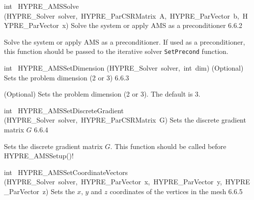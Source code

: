 \documentclass{article}
\begin{document}
\begin{cxxentry}
\begin{cxxentry}
\begin{cxxfunction}
\begin{cxxdoc}
\end{cxxdoc}
\end{cxxfunction}
\begin{cxxfunction}
{int\ }
        {HYPRE\_AMSSolve}
        {(HYPRE\_Solver\ solver,\ HYPRE\_ParCSRMatrix\ A,\ HYPRE\_ParVector\ b,\ HYPRE\_ParVector\ x)}
        {
Solve the system or apply AMS as a preconditioner}
        {6.6.2}
\begin{cxxdoc}

Solve the system or apply AMS as a preconditioner.
If used as a preconditioner, this function should be passed
to the iterative solver {\tt SetPrecond} function.


\end{cxxdoc}
\end{cxxfunction}
\begin{cxxfunction}
{int\ }
        {HYPRE\_AMSSetDimension}
        {(HYPRE\_Solver\ solver,\ int\ dim)}
        {
(Optional) Sets the problem dimension (2 or 3)}
        {6.6.3}
\begin{cxxdoc}

(Optional) Sets the problem dimension (2 or 3). The default is 3.
\end{cxxdoc}
\end{cxxfunction}
\begin{cxxfunction}
{int\ }
        {HYPRE\_AMSSetDiscreteGradient}
        {(HYPRE\_Solver\ solver,\ HYPRE\_ParCSRMatrix\ G)}
        {
Sets the discrete gradient matrix $G$}
        {6.6.4}
\begin{cxxdoc}

Sets the discrete gradient matrix $G$.
This function should be called before HYPRE\_AMSSetup()!
\end{cxxdoc}
\end{cxxfunction}
\begin{cxxfunction}
{int\ }
        {HYPRE\_AMSSetCoordinateVectors}
        {(HYPRE\_Solver\ solver,\ HYPRE\_ParVector\ x,\ HYPRE\_ParVector\ y,\ HYPRE\_ParVector\ z)}
        {
Sets the $x$, $y$ and $z$ coordinates of the vertices in the mesh}
        {6.6.5}
\begin{cxxdoc}


\end{cxxdoc}
\end{cxxfunction}
\end{cxxentry}
\end{cxxentry}
\end{document}
